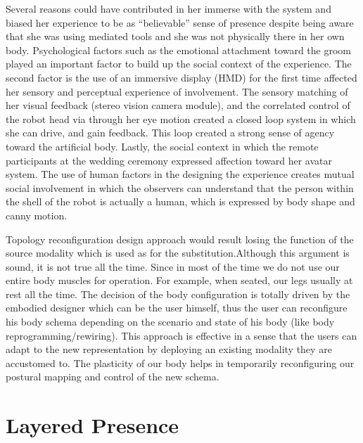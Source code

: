 Several reasons could have contributed in her immerse with the system and biased her experience to be as ``believable'' sense of presence despite being aware that she was using mediated tools and she was not physically there in her own body. Psychological factors such as the emotional attachment toward the groom played an important factor to build up the social context of the experience. The second factor is the use of an immersive display (HMD) for the first time affected her sensory and perceptual experience of involvement. The sensory matching of her visual feedback (stereo vision camera module), and the correlated control of the robot head via through her eye motion created a closed loop system in which she can drive, and gain feedback. This loop created a strong sense of agency toward the artificial body. Lastly, the social context in which the remote participants at the wedding ceremony expressed affection toward her avatar system. The use of human factors in the designing the experience creates mutual social involvement in which the observers can understand that the person within the shell of the robot is actually a human, which is expressed by body shape and canny motion. 

Topology reconfiguration design approach would result losing the function of the source modality which is used as for the substitution.Although this argument is sound, it is not true all the time. Since in most of the time we do not use our entire body muscles for operation. For example, when seated, our legs usually at rest all the time. The decision of the body configuration is totally driven by the embodied designer which can be the user himself, thus the user can reconfigure his body schema depending on the scenario and state of his body (like body reprogramming/rewiring). This approach is effective in a sense that the users can adapt to the new representation by deploying an existing modality they are accustomed to. The plasticity of our body helps in temporarily reconfiguring our postural mapping and control of the new schema.


\section{Layered Presence}
\label{sec:eval-layeredpresence}

